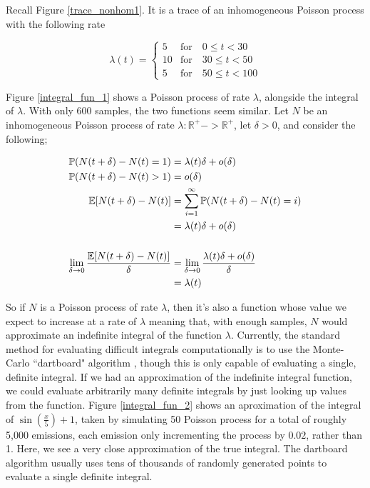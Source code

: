 Recall Figure \ref{trace_nonhom1}. It is a trace of an inhomogeneous Poisson process with the following rate

$$
\lambda(t) = 
\begin{cases}
5  & \mbox{for} \quad 0  \leqslant t < 30\\
10 & \mbox{for} \quad 30 \leqslant t < 50\\
5  & \mbox{for} \quad 50 \leqslant t < 100
\end{cases}
$$

Figure \ref{integral_fun_1} shows a Poisson process of rate $\lambda$, alongside the integral of $\lambda$. With only 600 samples, the two functions seem similar. Let $N$ be an inhomogeneous Poisson process of rate $\lambda: \mathbb{R}^{+}->\mathbb{R}^{+}$, let $\delta > 0$, and consider the following;

\begin{align*}
\mathbb{P} (N(t+\delta)-N(t) = 1) &= \lambda(t)\delta + o(\delta)\\
\mathbb{P} (N(t+\delta)-N(t) > 1) &= o(\delta)\\
\mathbb{E}[N(t+\delta)-N(t)] &= \sum_{i=1}^\infty \mathbb{P} (N(t+\delta)-N(t) = i)\\
&= \lambda(t)\delta + o(\delta)\\
\\
\lim_{\delta->0} \frac{\mathbb{E}[N(t+\delta)-N(t)]}{\delta} &= \lim_{\delta->0} \frac{\lambda(t)\delta + o(\delta)}{\delta}\\
&= \lambda(t)
\end{align*}

So if $N$ is a Poisson process of rate $\lambda$, then it's also a function whose value we expect to increase at a rate of $\lambda$ meaning that, with enough samples, $N$ would approximate an indefinite integral of the function $\lambda$. Currently, the standard method for evaluating difficult integrals computationally is to use the Monte-Carlo ``dartboard" algorithm \cite[]{montecarlo}, though this is only capable of evaluating a single, definite integral. If we had an approximation of the indefinite integral function, we could evaluate arbitrarily many definite integrals by just looking up values from the function. Figure \ref{integral_fun_2} shows an aproximation of the integral of $\sin\left(\frac{x}{5}\right)+1$, taken by simulating 50 Poisson process for a total of roughly 5,000 emissions, each emission only incrementing the process by $0.02$, rather than 1. Here, we see a very close approximation of the true integral. The dartboard algorithm usually uses tens of thousands of randomly generated points to evaluate a single definite integral.

